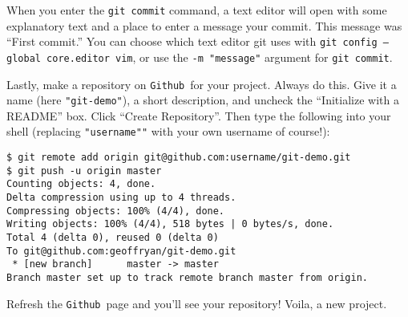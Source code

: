 \documentclass[14pt]{amsart}
\newcommand{\github}{{\texttt{Github}}}
\begin{document}
When you enter the \texttt{git commit} command, a text editor will open with some explanatory text and a place to enter a message your commit.  This message was ``First commit.''  You can choose which text editor git uses with \texttt{git config --global core.editor vim}, or use the \texttt{-m "message"} argument for \texttt{git commit}.

Lastly, make a repository on \github\ for your project.  Always do this.  Give it a name (here \texttt{"git-demo"}), a short description, and uncheck the ``Initialize with a README'' box.  Click ``Create Repository''.  Then type the following into your shell (replacing \texttt{"username""} with your own username of course!):
\begin{lstlisting}
$ git remote add origin git@github.com:username/git-demo.git
$ git push -u origin master
Counting objects: 4, done.
Delta compression using up to 4 threads.
Compressing objects: 100% (4/4), done.
Writing objects: 100% (4/4), 518 bytes | 0 bytes/s, done.
Total 4 (delta 0), reused 0 (delta 0)
To git@github.com:geoffryan/git-demo.git
 * [new branch]      master -> master
Branch master set up to track remote branch master from origin.
\end{lstlisting}
Refresh the \github\ page and you'll see your repository!  Voila, a new project.  
\end{document}

